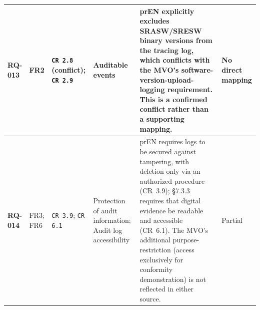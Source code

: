 \begin{longtable}{|>{\bfseries}p{1.0cm}|p{0.9cm}|p{2.4cm}|p{2.4cm}|p{4.8cm}|p{1.2cm}|}
	RQ-013 &
	FR2 &
	\texttt{CR 2.8} (conflict); \newline \texttt{CR 2.9} &
	Auditable events &
	prEN explicitly excludes SRASW/SRESW binary versions from the tracing log, which conflicts with the MVO's software-version-upload-logging requirement. This is a confirmed conflict rather than a supporting mapping. &
	No direct mapping \\
	\hline
	
	RQ-014 &
	FR3; FR6 &
	\texttt{CR 3.9}; \newline \texttt{CR 6.1} &
	Protection of audit information; Audit log accessibility &
	prEN requires logs to be secured against tampering, with deletion only via an authorized procedure (CR~3.9); \S7.3.3 requires that digital evidence be readable and accessible (CR~6.1). The MVO's additional purpose-restriction (access exclusively for conformity demonstration) is not reflected in either source. &
	Partial \\
	\hline
	
\end{longtable}
\normalsize